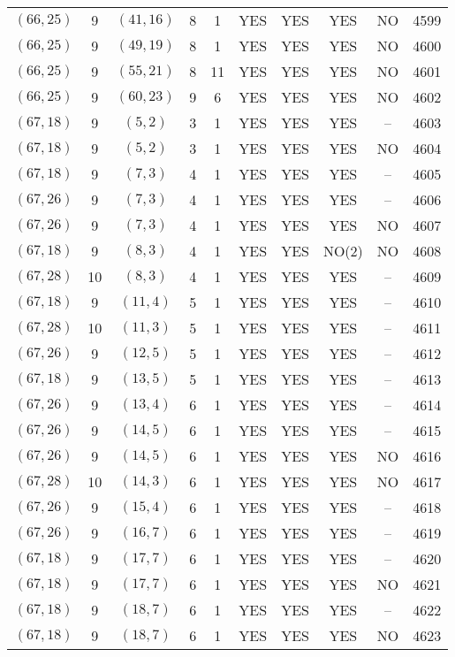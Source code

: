 \begin{longtable}{|c|c|c|c|c|c|c|c|c|c|}
$(66, 25)$ & 9 & $(41, 16)$ & 8 & 1 & YES & YES & YES & NO & 4599\\
$(66, 25)$ & 9 & $(49, 19)$ & 8 & 1 & YES & YES & YES & NO & 4600\\
$(66, 25)$ & 9 & $(55, 21)$ & 8 & 11 & YES & YES & YES & NO & 4601\\
$(66, 25)$ & 9 & $(60, 23)$ & 9 & 6 & YES & YES & YES & NO & 4602\\
$(67, 18)$ & 9 & $(5, 2)$ & 3 & 1 & YES & YES & YES & -- & 4603\\
$(67, 18)$ & 9 & $(5, 2)$ & 3 & 1 & YES & YES & YES & NO & 4604\\
$(67, 18)$ & 9 & $(7, 3)$ & 4 & 1 & YES & YES & YES & -- & 4605\\
$(67, 26)$ & 9 & $(7, 3)$ & 4 & 1 & YES & YES & YES & -- & 4606\\
$(67, 26)$ & 9 & $(7, 3)$ & 4 & 1 & YES & YES & YES & NO & 4607\\
$(67, 18)$ & 9 & $(8, 3)$ & 4 & 1 & YES & YES & NO(2) & NO & 4608\\
$(67, 28)$ & 10 & $(8, 3)$ & 4 & 1 & YES & YES & YES & -- & 4609\\
$(67, 18)$ & 9 & $(11, 4)$ & 5 & 1 & YES & YES & YES & -- & 4610\\
$(67, 28)$ & 10 & $(11, 3)$ & 5 & 1 & YES & YES & YES & -- & 4611\\
$(67, 26)$ & 9 & $(12, 5)$ & 5 & 1 & YES & YES & YES & -- & 4612\\
$(67, 18)$ & 9 & $(13, 5)$ & 5 & 1 & YES & YES & YES & -- & 4613\\
$(67, 26)$ & 9 & $(13, 4)$ & 6 & 1 & YES & YES & YES & -- & 4614\\
$(67, 26)$ & 9 & $(14, 5)$ & 6 & 1 & YES & YES & YES & -- & 4615\\
$(67, 26)$ & 9 & $(14, 5)$ & 6 & 1 & YES & YES & YES & NO & 4616\\
$(67, 28)$ & 10 & $(14, 3)$ & 6 & 1 & YES & YES & YES & NO & 4617\\
$(67, 26)$ & 9 & $(15, 4)$ & 6 & 1 & YES & YES & YES & -- & 4618\\
$(67, 26)$ & 9 & $(16, 7)$ & 6 & 1 & YES & YES & YES & -- & 4619\\
$(67, 18)$ & 9 & $(17, 7)$ & 6 & 1 & YES & YES & YES & -- & 4620\\
$(67, 18)$ & 9 & $(17, 7)$ & 6 & 1 & YES & YES & YES & NO & 4621\\
$(67, 18)$ & 9 & $(18, 7)$ & 6 & 1 & YES & YES & YES & -- & 4622\\
$(67, 18)$ & 9 & $(18, 7)$ & 6 & 1 & YES & YES & YES & NO & 4623\\

\end{longtable}
